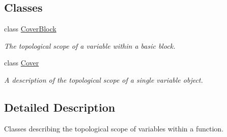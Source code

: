 \subsection*{Classes}
\begin{DoxyCompactItemize}
\item 
class \mbox{\hyperlink{class_cover_block}{Cover\+Block}}
\begin{DoxyCompactList}\small\item\em The topological scope of a variable within a basic block. \end{DoxyCompactList}\item 
class \mbox{\hyperlink{class_cover}{Cover}}
\begin{DoxyCompactList}\small\item\em A description of the topological scope of a single variable object. \end{DoxyCompactList}\end{DoxyCompactItemize}


\subsection{Detailed Description}
Classes describing the topological scope of variables within a function. 

